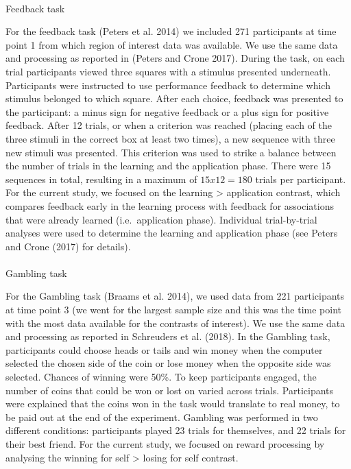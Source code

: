 \documentclass[
  letterpaper,
  DIV=11,
  numbers=noendperiod]{scrartcl}
\makeatletter
\let\oldparagraph\paragraph
\renewcommand{\paragraph}{
    \@ifstar
      \xxxParagraphStar
      \xxxParagraphNoStar
  }
\newcommand{\xxxParagraphStar}[1]{\oldparagraph*{#1}\mbox{}}
\newcommand{\xxxParagraphNoStar}[1]{\oldparagraph{#1}\mbox{}}
\makeatother
\begin{document}
\paragraph{Feedback task}\label{feedback-task}

For the feedback task (Peters et al. 2014) we included 271 participants
at time point 1 from which region of interest data was available. We use
the same data and processing as reported in (Peters and Crone 2017).
During the task, on each trial participants viewed three squares with a
stimulus presented underneath. Participants were instructed to use
performance feedback to determine which stimulus belonged to which
square. After each choice, feedback was presented to the participant: a
minus sign for negative feedback or a plus sign for positive feedback.
After 12 trials, or when a criterion was reached (placing each of the
three stimuli in the correct box at least two times), a new sequence
with three new stimuli was presented. This criterion was used to strike
a balance between the number of trials in the learning and the
application phase. There were 15 sequences in total, resulting in a
maximum of \(15 x 12 = 180\) trials per participant. For the current
study, we focused on the learning \textgreater{} application contrast,
which compares feedback early in the learning process with feedback for
associations that were already learned (i.e.~application phase).
Individual trial-by-trial analyses were used to determine the learning
and application phase (see Peters and Crone (2017) for details).

\paragraph{Gambling task}\label{gambling-task}

For the Gambling task (Braams et al. 2014), we used data from 221
participants at time point 3 (we went for the largest sample size and
this was the time point with the most data available for the contrasts
of interest). We use the same data and processing as reported in
Schreuders et al. (2018). In the Gambling task, participants could
choose heads or tails and win money when the computer selected the
chosen side of the coin or lose money when the opposite side was
selected. Chances of winning were 50\%. To keep participants engaged,
the number of coins that could be won or lost on varied across trials.
Participants were explained that the coins won in the task would
translate to real money, to be paid out at the end of the experiment.
Gambling was performed in two different conditions: participants played
23 trials for themselves, and 22 trials for their best friend. For the
current study, we focused on reward processing by analysing the winning
for self \textgreater{} losing for self contrast.
\end{document}
